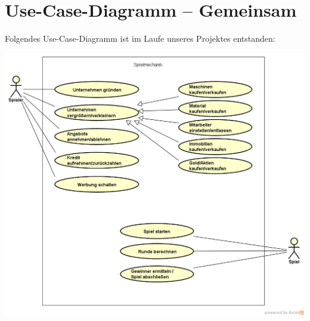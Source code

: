 \chapter{Use-Case-Diagramm -- Gemeinsam}

Folgendes Use-Case-Diagramm ist im Laufe unseres Projektes entstanden:

\begin{minipage}{\linewidth}
	\centering
	\includegraphics[scale=0.55]{img/UseCasezweiteIterationFallstudie.png}
	\vspace{2em}
\end{minipage}